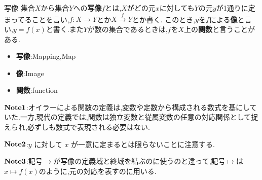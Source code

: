 \documentclass[dvipdfmx,b4j]{jsarticle}
\begin{document}
\subsubsection{}
\begin{definition}{写像}{}
集合$X$から集合$Y$への\textbf{写像}$f$とは,$X$がどの元$x$に対しても$Y$の元$y$が1通りに定まってることを言い,$f\colon X\to Y$とか$X\stackrel{f}{\to}Y$とか書く.
このとき,$y$を$f$による\textbf{像}と言い,$y=f(x)$と書く.また$Y$が数の集合であるときは,$f$を$X$上の\textbf{関数}と言うことがある.
\tcbline
\begin{itemize}
    \item \textbf{写像}:Mapping,Map
    \item \textbf{像}:Image
    \item \textbf{関数}:function
\end{itemize}
%
\end{definition}
\noindent $\bf{Note1}$:オイラーによる関数の定義は,変数や定数から構成される数式を基にしていた.一方,現代の定義では,関数は独立変数と従属変数の任意の対応関係として捉えられ,必ずしも数式で表現される必要はない.

\noindent $\bf{Note2}$:$y$ に対して $x$ が一意に定まるとは限らないことに注意する.

\noindent $\bf{Note3}$:記号$\longrightarrow$が写像の定義域と終域を結ぶのに使うのと違って,記号$\longmapsto$は$x\longmapsto f(x)$のように,元の対応を表すのに用いる.
\end{document}
